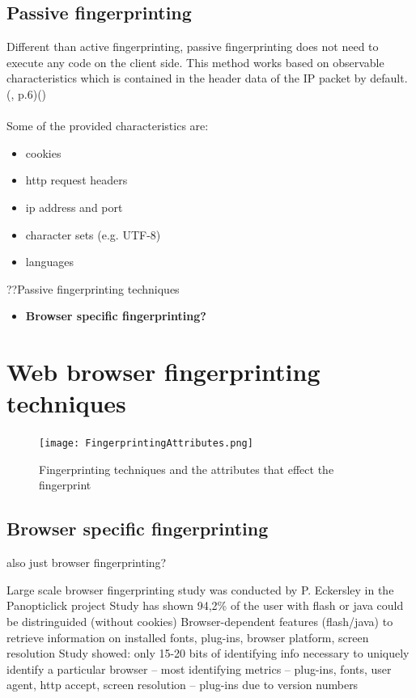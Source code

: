 \subsection{Passive fingerprinting}
Different than active fingerprinting, passive fingerprinting does not need to execute any code on the client side. This method works based on observable characteristics which is contained in the header data of the IP packet by default. (\textcite{doty18}, p.6)(\textcite{web17})\\\\
Some of the provided characteristics are:
\begin{itemize}
	\item cookies
	\item http request headers
	\item ip address and port
	\item character sets (e.g. UTF-8)
	\item languages\\
\end{itemize}
??Passive fingerprinting techniques
\begin{itemize}
	\item \textbf{Browser specific fingerprinting?}
\end{itemize}

\newpage
\section{Web browser fingerprinting techniques}
\begin{figure}[H]
	\centering
	\texttt{[image: FingerprintingAttributes.png]}
	\caption{Fingerprinting techniques and the attributes that effect the fingerprint}
	\label{BrowserSpecification}
\end{figure}
\subsection{Browser specific fingerprinting}

also just browser fingerprinting?


Large scale browser fingerprinting study was conducted by P. Eckersley in the Panopticlick project
Study has shown 94,2\% of the user with flash or java could be distringuided (without cookies)
Browser-dependent features (flash/java) to retrieve information on installed fonts, plug-ins, browser platform, screen resolution
Study showed: only 15-20 bits of identifying info necessary to uniquely identify a particular browser – most identifying metrics – plug-ins, fonts, user agent, http accept, screen resolution – plug-ins due to version numbers


